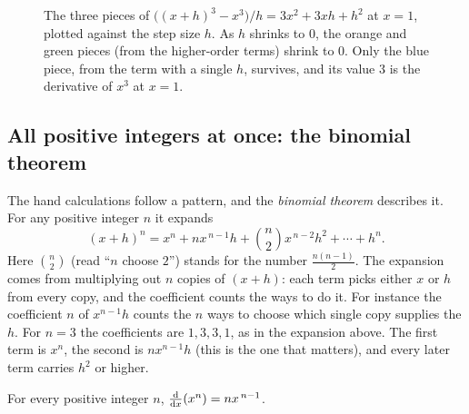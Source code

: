 \begin{figure}[htbp]
\centering
{}
\caption{The three pieces of $\bigl((x+h)^3-x^3\bigr)/h = 3x^2 + 3xh + h^2$ at $x=1$,
plotted against the step size $h$. As $h$ shrinks to $0$, the orange and green pieces
(from the higher-order terms) shrink to $0$. Only the blue piece, from the term with a
single $h$, survives, and its value $3$ is the derivative of $x^3$ at $x=1$.}
\label{ch11:fig-orders}
\end{figure}

\subsection{All positive integers at once: the binomial theorem}

The hand calculations follow a pattern, and the \emph{binomial theorem} describes it.
For any positive integer $n$ it expands
\[
  (x+h)^n
  = x^n + n x^{\,n-1} h + \binom{n}{2} x^{\,n-2} h^2 + \cdots + h^n .
\]
Here $\binom{n}{2}$ (read ``$n$ choose $2$'') stands for the number $\tfrac{n(n-1)}{2}$.
The expansion comes from multiplying out $n$ copies of $(x+h)$: each term picks either
$x$ or $h$ from every copy, and the coefficient counts the ways to do it. For instance
the coefficient $n$ of $x^{n-1}h$ counts the $n$ ways to choose which single copy
supplies the $h$. For $n=3$ the coefficients are $1, 3, 3, 1$, as in the expansion above.
The first term is $x^n$, the second is $n x^{n-1}h$ (this is the one that matters), and
every later term carries $h^2$ or higher.

\begin{theorem}\label{ch11:thm-power-int}
For every positive integer $n$, $\frac{\mathrm{d}}{\mathrm{d} x}\!\left(x^n\right) = n x^{\,n-1}$.
\end{theorem}

